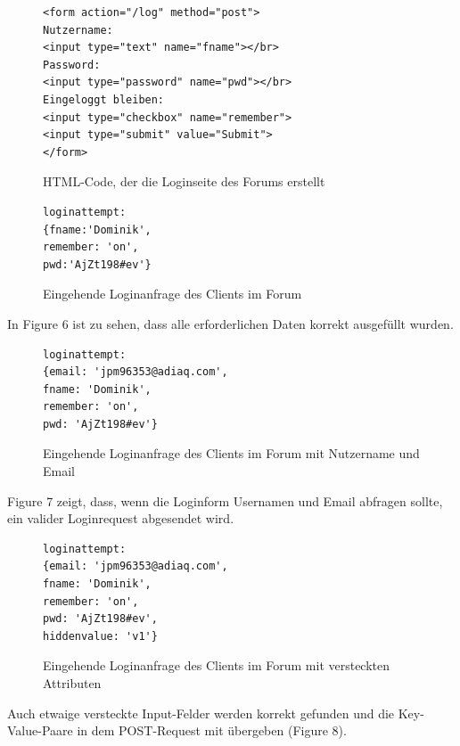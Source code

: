 \begin{figure}[ht]
\begin{lstlisting}[language=HTML5]
<form action="/log" method="post">
Nutzername: 
<input type="text" name="fname"></br>
Password: 
<input type="password" name="pwd"></br>
Eingeloggt bleiben: 
<input type="checkbox" name="remember">
<input type="submit" value="Submit">
</form>
\end{lstlisting}
\caption{HTML-Code, der die Loginseite des Forums erstellt}
\end{figure}
\newpage

\begin{figure}[h!]
\begin{lstlisting}[language=HTML5]
loginattempt: 
{fname:'Dominik',
remember: 'on',
pwd:'AjZt198#ev'}
\end{lstlisting}
\caption{Eingehende Loginanfrage des Clients im Forum}
\end{figure}

In Figure 6 ist zu sehen, dass alle erforderlichen Daten korrekt ausgefüllt wurden.

\begin{figure}[h!]
\begin{lstlisting}[language=HTML5]
loginattempt:
{email: 'jpm96353@adiaq.com',
fname: 'Dominik',
remember: 'on',
pwd: 'AjZt198#ev'}
\end{lstlisting}
\caption{Eingehende Loginanfrage des Clients im Forum mit Nutzername und Email}
\end{figure}
Figure 7 zeigt, dass, wenn die Loginform Usernamen und Email abfragen sollte, ein valider Loginrequest abgesendet wird.

\begin{figure}[h!]
\begin{lstlisting}[language=HTML5]
loginattempt:
{email: 'jpm96353@adiaq.com',
fname: 'Dominik',
remember: 'on',
pwd: 'AjZt198#ev',
hiddenvalue: 'v1'}
\end{lstlisting}
\caption{Eingehende Loginanfrage des Clients im Forum mit versteckten Attributen}
\end{figure}

Auch etwaige versteckte Input-Felder werden korrekt gefunden und die Key-Value-Paare in dem POST-Request mit übergeben (Figure 8).
\newpage

